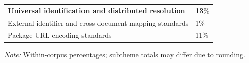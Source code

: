 \begin{table}[htbp]
\begin{tabular}{@{}ll@{}}
\textbf{Universal identification and distributed resolution} & \textbf{13}\% \\
\hspace{1.5em}External identifier and cross-document mapping standards & 1\% \\
\hspace{1.5em}Package URL encoding standards & 11\% \\

\bottomrule
\end{tabular}
\par
{\scriptsize\emph{Note:} Within-corpus percentages; subtheme totals may differ due to rounding.}
\end{table}
